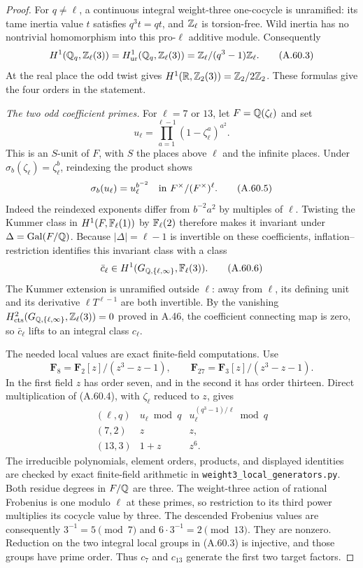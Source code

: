 \begin{proof}
For $q\ne\ell$, a continuous integral weight-three
one-cocycle is unramified: its tame inertia value $t$
satisfies $q^3t=qt$, and $\mathbb Z_\ell$ is torsion-free.
Wild inertia has no nontrivial homomorphism into this
pro-$\ell$ additive module.  Consequently
\[
 H^1(\mathbb Q_q,\mathbb Z_\ell(3))
       =H^1_{\rm ur}(\mathbb Q_q,\mathbb Z_\ell(3))
       =\mathbb Z_\ell/(q^3-1)\mathbb Z_\ell.
 \tag{A.60.3}
\]
At the real place the odd twist gives
$H^1(\mathbb R,\mathbb Z_2(3))=\mathbb Z_2/2\mathbb Z_2$.
These formulas give the four orders in the statement.

\emph{The two odd coefficient primes.}
For $\ell=7$ or $13$, let $F=\mathbb Q(\zeta_\ell)$ and set
\[
              u_\ell=\prod_{a=1}^{\ell-1}
                            (1-\zeta_\ell^a)^{a^2}.
 \tag{A.60.4}
\]
This is an $S$-unit of $F$, with $S$ the places above
$\ell$ and the infinite places.  Under
$\sigma_b(\zeta_\ell)=\zeta_\ell^b$, reindexing the
product shows
\[
       \sigma_b(u_\ell)=u_\ell^{b^{-2}}
                       \quad\hbox{in }F^\times/(F^\times)^\ell.
 \tag{A.60.5}
\]
Indeed the reindexed exponents differ from
$b^{-2}a^2$ by multiples of $\ell$.
Twisting the Kummer class in $H^1(F,\mathbb F_\ell(1))$
by $\mathbb F_\ell(2)$ therefore makes it invariant under
$\Delta=\operatorname{Gal}(F/\mathbb Q)$.
Because $|\Delta|=\ell-1$ is invertible on these
coefficients, inflation--restriction identifies this
invariant class with a class
\[
          \bar c_\ell\in
          H^1(G_{\mathbb Q,\{\ell,\infty\}},\mathbb F_\ell(3)).
 \tag{A.60.6}
\]
The Kummer extension is unramified outside $\ell$:
away from $\ell$, its defining unit and its derivative
$\ell T^{\ell-1}$ are both invertible.
By the vanishing
$H^2_{\rm cts}(G_{\mathbb Q,\{\ell,\infty\}},\mathbb Z_\ell(3))=0$
proved in A.46, the coefficient connecting map is zero,
so $\bar c_\ell$ lifts to an integral class $c_\ell$.

The needed local values are exact finite-field computations.
Use
\[
 \mathbf F_8=\mathbf F_2[z]/(z^3-z-1),\qquad
 \mathbf F_{27}=\mathbf F_3[z]/(z^3-z-1).
 \tag{A.60.7}
\]
In the first field $z$ has order seven, and in the second
it has order thirteen.  Direct multiplication of
(A.60.4), with $\zeta_\ell$ reduced to $z$, gives
\[
 \begin{array}{c|c|c}
 (\ell,q)&u_\ell\bmod q&
          u_\ell^{(q^3-1)/\ell}\bmod q\\\hline
 (7,2)&z&z,\\
 (13,3)&1+z&z^6.
 \end{array}
 \tag{A.60.8}
\]
The irreducible polynomials, element orders, products,
and displayed identities are checked by exact finite-field
arithmetic in \texttt{weight3\_local\_generators.py}.
Both residue degrees in $F/\mathbb Q$ are three.
The weight-three action of rational Frobenius is one
modulo $\ell$ at these primes, so restriction to its
third power multiplies its cocycle value by three.
The descended Frobenius values are consequently
$3^{-1}=5\pmod7$ and $6\cdot3^{-1}=2\pmod{13}$.
They are nonzero.  Reduction on the two integral local
groups in (A.60.3) is injective, and those groups have
prime order.  Thus $c_7$ and $c_{13}$ generate the first
two target factors.


\end{proof}
